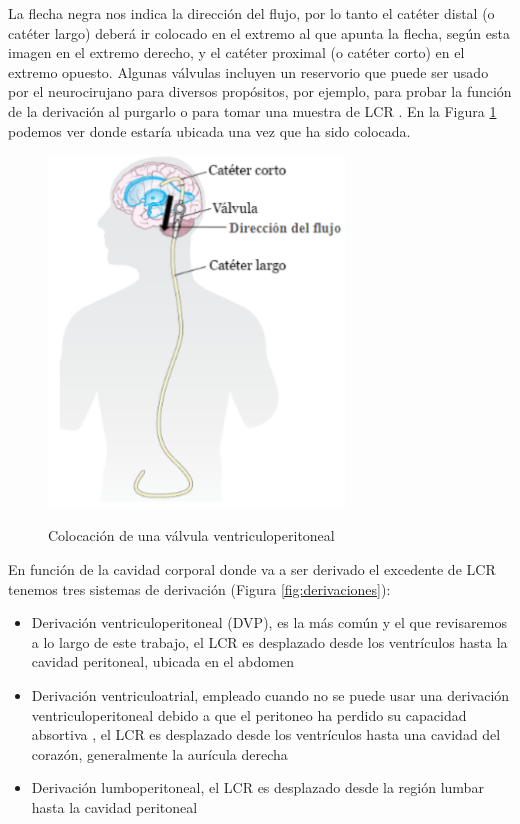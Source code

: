 La flecha negra nos indica la dirección del flujo, por lo tanto el catéter distal (o catéter largo) deberá ir colocado en el extremo al que apunta la flecha, según esta imagen en el extremo derecho, y el catéter proximal (o catéter corto) en el extremo opuesto. Algunas válvulas incluyen un reservorio que puede ser usado por el neurocirujano para diversos propósitos, por ejemplo, para probar la función de la derivación al purgarlo o para tomar una muestra de LCR \cite{derivacion}. En la Figura \ref{fig:colocacion_valvula} podemos ver donde estaría ubicada una vez que ha sido colocada.
\begin{figure}[h]
    \centering
    \includegraphics[width=0.7\textwidth]{img/Colocacion_valvula.PNG}
    \caption{Colocación de una válvula ventriculoperitoneal}
    \cite{colocacion_derivacion}
    \label{fig:colocacion_valvula}
\end{figure}

En función de la cavidad corporal donde va a ser derivado el excedente de LCR tenemos tres sistemas de derivación (Figura \ref{fig:derivaciones}):
\begin{itemize}
    \item Derivación ventriculoperitoneal (DVP), es la más común y el que revisaremos a lo largo de este trabajo, el LCR es desplazado desde los ventrículos hasta la cavidad peritoneal, ubicada en el abdomen 
    \item Derivación ventriculoatrial, empleado cuando no se puede usar una derivación ventriculoperitoneal debido a que el peritoneo ha perdido su capacidad absortiva \cite{elsevier_dva}, el LCR es desplazado desde los ventrículos hasta una cavidad del corazón, generalmente la aurícula derecha \cite{au_dcha} 
    \item Derivación lumboperitoneal, el LCR es desplazado desde la región lumbar hasta la cavidad peritoneal
\end{itemize}

